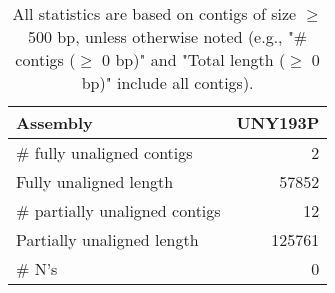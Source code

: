 \documentclass[12pt,a4paper]{article}
\begin{document}
\begin{table}[ht]
\begin{center}
\caption{All statistics are based on contigs of size $\geq$ 500 bp, unless otherwise noted (e.g., "\# contigs ($\geq$ 0 bp)" and "Total length ($\geq$ 0 bp)" include all contigs).}
\begin{tabular}{|l*{1}{|r}|}
\hline
Assembly & UNY193P \\ \hline
\# fully unaligned contigs & 2 \\ \hline
Fully unaligned length & 57852 \\ \hline
\# partially unaligned contigs & 12 \\ \hline
Partially unaligned length & 125761 \\ \hline
\# N's & 0 \\ \hline
\end{tabular}
\end{center}
\end{table}
\end{document}
